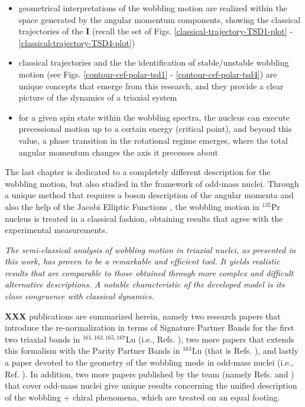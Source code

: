 \begin{itemize}
    \item geometrical interpretations of the wobbling motion are realized within the space generated by the angular momentum components, showing the classical trajectories of the $\mathbf{I}$ (recall the set of Figs. \ref{classical-trajectory-TSD1-plot} - \ref{classical-trajectory-TSD4-plot})
    \item classical trajectories and the the identification of stable/unstable wobbling motion (see Figs. \ref{contour-cef-polar-tsd1} - \ref{contour-cef-polar-tsd4}) are unique concepts that emerge from this research, and they provide a clear picture of the dynamics of a triaxial system
    \item for a given spin state within the wobbling spectra, the nucleus can execute precessional motion up to a certain energy (critical point), and beyond this value, a phase transition in the rotational regime emerges, where the total angular momentum changes the axis it precesses about
\end{itemize}

The last chapter is dedicated to a completely different description for the wobbling motion, but also studied in the framework of odd-mass nuclei. Through a unique method that requires a boson description of the angular momenta and also the help of the Jacobi Elliptic Functions \cite{jacobi1829fundamenta}, the wobbling motion in $^{135}$Pr nucleus is treated in a classical fashion, obtaining results that agree with the experimental measurements.

\emph{The semi-classical analysis of wobbling motion in triaxial nuclei, as presented in this work, has proven to be a remarkable and efficient tool. It yields realistic results that are comparable to those obtained through more complex and difficult alternative descriptions. A notable characteristic of the developed model is its close congruence with classical dynamics.}

{\color{red}\textbf{XXX}} publications are summarized herein, namely two research papers that introduce the re-normalization in terms of Signature Partner Bands for the first two triaxial bands in $^{161,163,165,167}$Lu (i.e., Refs. \cite{raduta2020approach,raduta2020towards}), two more papers that extends this formalism with the Parity Partner Bands in $^{163}$Lu (that is Refs. \cite{poenaru2021parity,poenaru2021extensive1}), and lastly a paper devoted to the geometry of the wobbling mode in odd-mass nuclei (i.e., Ref. \cite{poenaru2021extensive2}). In addition, two more papers published by the team (namely Refs. \cite{raduta2020new} and \cite{raduta2022simultaneous}) that cover odd-mass nuclei give unique results concerning the unified description of the wobbling + chiral phenomena, which are treated on an equal footing.